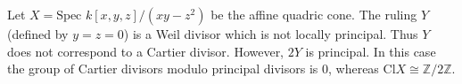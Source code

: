 Let $X = \text{Spec } k[x,y,z]/(xy - z^2)$ be the affine quadric cone. The ruling $Y$ (defined by $y=z=0$) is a Weil divisor which is not locally principal. Thus $Y$ does not correspond to a Cartier divisor. However, $2Y$ is principal. In this case the group of Cartier divisors modulo principal divisors is $0$, whereas $\text{Cl} X \cong \mathbb{Z}/2\mathbb{Z}$.
